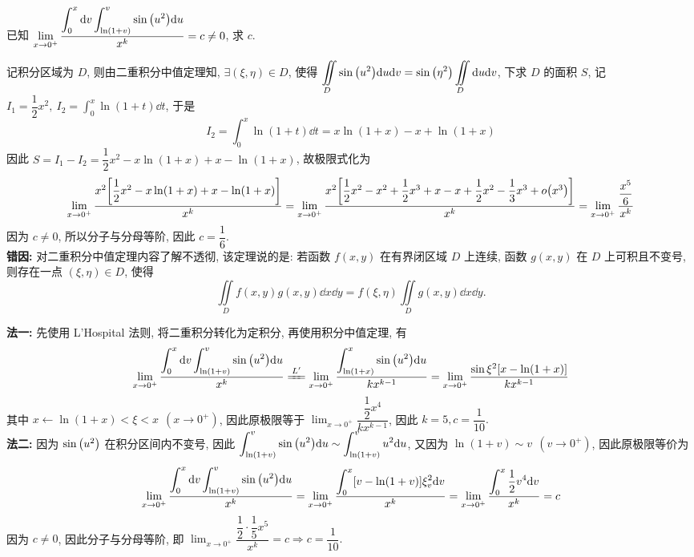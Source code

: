 \begin{example}
    已知 $\displaystyle\lim_{x\to0^+}\dfrac{\displaystyle\int_{0}^{x}\dd v\int_{\ln(1+v)}^{v}\sin\qty(u^2)\dd u}{x^k}=c\neq0$, 求 $c.$
\end{example}
\begin{errorSolution}
    记积分区域为 $D$, 则由二重积分中值定理知, $\exists(\xi,\eta)\in D$, 使得 $\displaystyle\iint\limits_D \sin\qty(u^2)\dd u\dd v=\sin\qty(\eta^2)\iint\limits_D \dd u\dd v$, 下求 $D$ 的面积 $S$, 
    记 $I_1=\dfrac{1}{2}x^2,~\displaystyle I_2=\int_{0}^{x}\ln(1+t)\dd t$, 于是 $$I_2=\int_{0}^{x}\ln(1+t)\dd t=x\ln(1+x)-x+\ln(1+x)$$
    因此 $S=I_1-I_2=\dfrac{1}{2}x^2-x\ln(1+x)+x-\ln(1+x)$, 故极限式化为
    $$\lim_{x\to0^+}\dfrac{x^2\qty[\dfrac{1}{2}x^2-x\ln(1+x)+x-\ln(1+x)]}{x^k}=\lim_{x\to0^+}\dfrac{x^2\qty[\dfrac{1}{2}x^2-x^2+\dfrac{1}{2}x^3+x-x+\dfrac{1}{2}x^2-\dfrac{1}{3}x^3+o\qty(x^3)]}{x^k}=\lim_{x\to0^+}\dfrac{\dfrac{x^5}{6}}{x^k}$$
    因为 $c\neq0$, 所以分子与分母等阶, 因此 $c=\dfrac{1}{6}.$\\
    \textbf{错因: }对二重积分中值定理内容了解不透彻, 该定理说的是: 若函数 $f(x,y)$ 在有界闭区域 $D$ 上连续, 函数 $g(x,y)$ 在 $D$ 上可积且不变号, 则存在一点 $(\xi,\eta)\in D$, 使得 $$\iint\limits_D f(x,y)g(x,y)\dd x\dd y=f(\xi,\eta)\iint\limits_D g(x,y)\dd x\dd y.$$
\end{errorSolution}
\begin{solution}
    \textbf{法一: }先使用 L'Hospital 法则, 将二重积分转化为定积分, 再使用积分中值定理, 有
    $$\lim_{x\to0^+}\dfrac{\displaystyle\int_{0}^{x}\dd v\int_{\ln(1+v)}^{v}\sin\qty(u^2)\dd u}{x^k}\xlongequal{L'}\lim_{x\to0^+}\dfrac{\displaystyle\int_{\ln(1+x)}^{x}\sin\qty(u^2)\dd u}{kx^{k-1}}=\lim_{x\to0^+}\dfrac{\sin\xi^2[x-\ln(1+x)]}{kx^{k-1}}$$
    其中 $x\gets\ln(1+x)<\xi<x~~(x\to0^+)$, 因此原极限等于 $\displaystyle\lim_{x\to0^+}\dfrac{\dfrac{1}{2}x^4}{kx^{k-1}}$, 因此 $k=5,c=\dfrac{1}{10}.$\\
    \textbf{法二: }因为 $\sin \qty(u^2)$ 在积分区间内不变号, 因此 $\displaystyle\int_{\ln(1+v)}^{v}\sin\qty(u^2)\dd u\sim\int_{\ln(1+v)}^{v}u^2\dd u$, 又因为 $\ln(1+v)\sim v~~(v\to0^+)$, 因此原极限等价为
    $$\lim_{x\to0^+}\dfrac{\displaystyle\int_{0}^{x}\dd v\int_{\ln(1+v)}^{v}\sin\qty(u^2)\dd u}{x^k}=\lim_{x\to0^+}\dfrac{\displaystyle\int_{0}^{x}[v-\ln(1+v)]\xi_v^2\dd v}{x^k}=\lim_{x\to0^+}\dfrac{\displaystyle \int_{0}^{x}\dfrac{1}{2}v^4\dd v}{x^k}=c$$
    因为 $c\neq0$, 因此分子与分母等阶, 即 $\displaystyle\lim_{x\to0^+}\dfrac{\dfrac{1}{2}\cdot\dfrac{1}{5}x^5}{x^k}=c\Rightarrow c=\dfrac{1}{10}.$
\end{solution}

